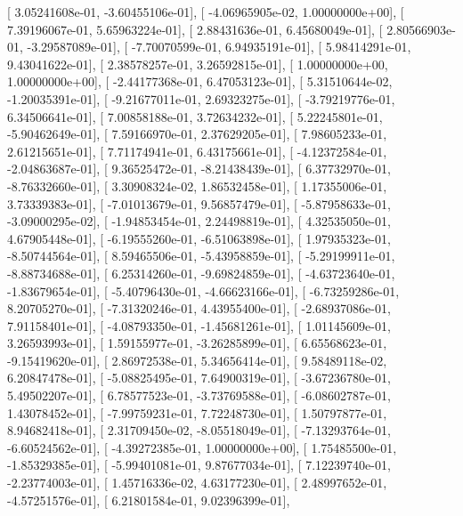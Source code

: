 \documentclass{article}
\begin{document}
       [  3.05241608e-01,  -3.60455106e-01],
       [ -4.06965905e-02,   1.00000000e+00],
       [  7.39196067e-01,   5.65963224e-01],
       [  2.88431636e-01,   6.45680049e-01],
       [  2.80566903e-01,  -3.29587089e-01],
       [ -7.70070599e-01,   6.94935191e-01],
       [  5.98414291e-01,   9.43041622e-01],
       [  2.38578257e-01,   3.26592815e-01],
       [  1.00000000e+00,   1.00000000e+00],
       [ -2.44177368e-01,   6.47053123e-01],
       [  5.31510644e-02,  -1.20035391e-01],
       [ -9.21677011e-01,   2.69323275e-01],
       [ -3.79219776e-01,   6.34506641e-01],
       [  7.00858188e-01,   3.72634232e-01],
       [  5.22245801e-01,  -5.90462649e-01],
       [  7.59166970e-01,   2.37629205e-01],
       [  7.98605233e-01,   2.61215651e-01],
       [  7.71174941e-01,   6.43175661e-01],
       [ -4.12372584e-01,  -2.04863687e-01],
       [  9.36525472e-01,  -8.21438439e-01],
       [  6.37732970e-01,  -8.76332660e-01],
       [  3.30908324e-02,   1.86532458e-01],
       [  1.17355006e-01,   3.73339383e-01],
       [ -7.01013679e-01,   9.56857479e-01],
       [ -5.87958633e-01,  -3.09000295e-02],
       [ -1.94853454e-01,   2.24498819e-01],
       [  4.32535050e-01,   4.67905448e-01],
       [ -6.19555260e-01,  -6.51063898e-01],
       [  1.97935323e-01,  -8.50744564e-01],
       [  8.59465506e-01,  -5.43958859e-01],
       [ -5.29199911e-01,  -8.88734688e-01],
       [  6.25314260e-01,  -9.69824859e-01],
       [ -4.63723640e-01,  -1.83679654e-01],
       [ -5.40796430e-01,  -4.66623166e-01],
       [ -6.73259286e-01,   8.20705270e-01],
       [ -7.31320246e-01,   4.43955400e-01],
       [ -2.68937086e-01,   7.91158401e-01],
       [ -4.08793350e-01,  -1.45681261e-01],
       [  1.01145609e-01,   3.26593993e-01],
       [  1.59155977e-01,  -3.26285899e-01],
       [  6.65568623e-01,  -9.15419620e-01],
       [  2.86972538e-01,   5.34656414e-01],
       [  9.58489118e-02,   6.20847478e-01],
       [ -5.08825495e-01,   7.64900319e-01],
       [ -3.67236780e-01,   5.49502207e-01],
       [  6.78577523e-01,  -3.73769588e-01],
       [ -6.08602787e-01,   1.43078452e-01],
       [ -7.99759231e-01,   7.72248730e-01],
       [  1.50797877e-01,   8.94682418e-01],
       [  2.31709450e-02,  -8.05518049e-01],
       [ -7.13293764e-01,  -6.60524562e-01],
       [ -4.39272385e-01,   1.00000000e+00],
       [  1.75485500e-01,  -1.85329385e-01],
       [ -5.99401081e-01,   9.87677034e-01],
       [  7.12239740e-01,  -2.23774003e-01],
       [  1.45716336e-02,   4.63177230e-01],
       [  2.48997652e-01,  -4.57251576e-01],
       [  6.21801584e-01,   9.02396399e-01],
\end{document}
